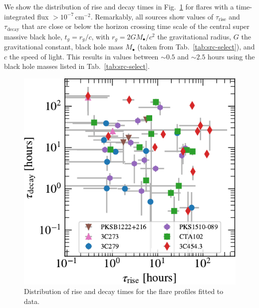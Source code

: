 \documentclass[twocolumn,linenumbers]{aastex62}
\begin{document}
We show the distribution of rise and decay times in  Fig.~\ref{fig:times-hist} for flares with a time-integrated flux $>10^{-7}\,\mathrm{cm}^{-2}$. 
Remarkably, all sources show values of $\tau_\mathrm{rise}$ and $\tau_\mathrm{decay}$ that are close or below the horizon crossing time scale of the central super massive black hole,
$t_g = r_g / c$, with $r_g = 2 G M_\bullet / c^2 $ the gravitational radius, $G$ the gravitational constant, black hole mass $M_\bullet$ (taken from Tab.~\ref{tab:src-select}), and $c$ the speed of light.
This results in values between $\sim0.5$ and $\sim2.5$ hours using the black hole masses listed in Tab.~\ref{tab:src-select}.

\begin{figure}
    \centering
    \includegraphics[width = .9\linewidth]{figures/lcfithop_results_trise_vs_tdecay_orbit_maxiter2_fsys0p00_addcomp0.pdf}
    \caption{
    Distribution of rise and decay times for the flare profiles fitted to data. 
    }
    \label{fig:times-hist}
\end{figure}
\end{document}
